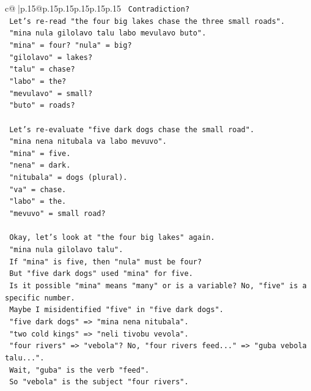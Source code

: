 \documentclass{article}
\begin{document}
{\begin{supertabular}{c@{$\;$}|p{.15\linewidth}@{}p{.15\linewidth}p{.15\linewidth}p{.15\linewidth}p{.15\linewidth}p{.15\linewidth}}
{{{\texttt{   Contradiction?} \\
\texttt{   Let's re{-}read "the four big lakes chase the three small roads".} \\
\texttt{   "mina nula gilolavo talu labo mevulavo buto".} \\
\texttt{   "mina" = four? "nula" = big?} \\
\texttt{   "gilolavo" = lakes?} \\
\texttt{   "talu" = chase?} \\
\texttt{   "labo" = the?} \\
\texttt{   "mevulavo" = small?} \\
\texttt{   "buto" = roads?} \\
\\ 
\texttt{   Let's re{-}evaluate "five dark dogs chase the small road".} \\
\texttt{   "mina nena nitubala va labo mevuvo".} \\
\texttt{   "mina" = five.} \\
\texttt{   "nena" = dark.} \\
\texttt{   "nitubala" = dogs (plural).} \\
\texttt{   "va" = chase.} \\
\texttt{   "labo" = the.} \\
\texttt{   "mevuvo" = small road?} \\
\\ 
\texttt{   Okay, let's look at "the four big lakes" again.} \\
\texttt{   "mina nula gilolavo talu".} \\
\texttt{   If "mina" is five, then "nula" must be four?} \\
\texttt{   But "five dark dogs" used "mina" for five.} \\
\texttt{   Is it possible "mina" means "many" or is a variable? No, "five" is a specific number.} \\
\texttt{   Maybe I misidentified "five" in "five dark dogs".} \\
\texttt{   "five dark dogs" => "mina nena nitubala".} \\
\texttt{   "two cold kings" => "neli tivobu vevola".} \\
\texttt{   "four rivers" => "vebola"? No, "four rivers feed..." => "guba vebola talu...".} \\
\texttt{   Wait, "guba" is the verb "feed".} \\
\texttt{   So "vebola" is the subject "four rivers".} \\
}}}
\end{supertabular}}
\end{document}
